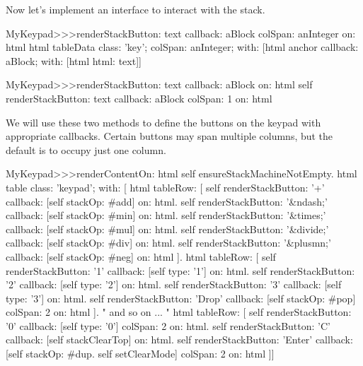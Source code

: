 \documentclass[a4paper,10pt,twoside]{book}
\begin{document}
Now let's implement an interface to interact with the stack.


\begin{code}{}
MyKeypad>>>renderStackButton: text callback: aBlock colSpan: anInteger on: html 
	html tableData
		class: 'key';
		colSpan: anInteger;
		with: 
				[html anchor
					callback: aBlock;
					with: [html html: text]]
\end{code}


\begin{code}{}
MyKeypad>>>renderStackButton: text callback: aBlock on: html 
	self 
		renderStackButton: text
		callback: aBlock
		colSpan: 1
		on: html
\end{code}

We will use these two methods to define the buttons on the keypad with appropriate
callbacks.
Certain buttons may span multiple columns, but the default is to occupy just one column.


\begin{code}{}
MyKeypad>>>renderContentOn: html 
  self ensureStackMachineNotEmpty.
  html table
    class: 'keypad';
    with: [
      html tableRow: [
          self renderStackButton: '+' callback: [self stackOp: #add] on: html.
          self renderStackButton: '&ndash;' callback: [self stackOp: #min] on: html.
          self renderStackButton: '&times;' callback: [self stackOp: #mul] on: html.
          self renderStackButton: '&divide;' callback: [self stackOp: #div] on: html.
          self renderStackButton: '&plusmn;' callback: [self stackOp: #neg] on: html ].
        html tableRow: [
          self renderStackButton: '1' callback: [self type: '1'] on: html.
          self renderStackButton: '2' callback: [self type: '2'] on: html.
          self renderStackButton: '3' callback: [self type: '3'] on: html.
          self renderStackButton: 'Drop' callback: [self stackOp: #pop]
          	colSpan: 2 on: html ].
" and so on ... "
        html tableRow: [
          self renderStackButton: '0' callback: [self type: '0'] colSpan: 2 on: html.
          self renderStackButton: 'C' callback: [self stackClearTop] on: html.
          self renderStackButton: 'Enter'
          	callback: [self stackOp: #dup. self setClearMode]
			colSpan: 2 on: html ]]
\end{code}
\end{document}
